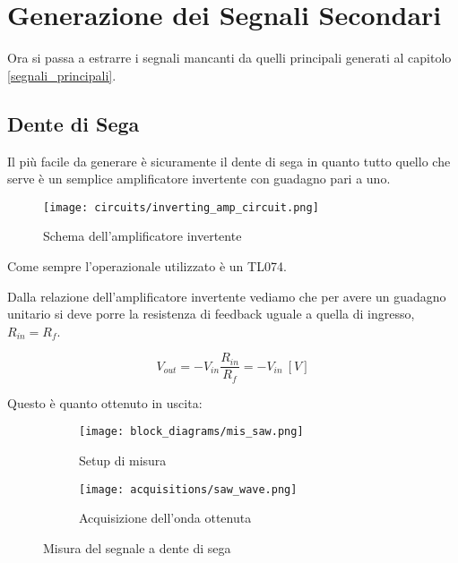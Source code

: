 \chapter{Generazione dei Segnali Secondari}\label{segnali_secondari}


Ora si passa a estrarre i segnali mancanti da quelli principali generati al capitolo \ref{segnali_principali}.


\section{Dente di Sega}


Il più facile da generare è sicuramente il dente di sega in quanto tutto quello che serve è un
semplice amplificatore invertente con guadagno pari a uno.

\begin{figure}[H]
    \centering
    \texttt{[image: circuits/inverting\_amp\_circuit.png]}
    \caption{Schema dell'amplificatore invertente}
    \label{inverting_amp_circuit}
\end{figure}

Come sempre l'operazionale utilizzato è un TL074.

Dalla relazione dell'amplificatore invertente vediamo che per avere un guadagno unitario si
deve porre la resistenza di feedback uguale a quella di ingresso, $R_{in}=R_f$.

\begin{equation}
    V_{out}=-V_{in}\frac{R_{in}}{R_f}=-V_{in}\ [V]
\end{equation}

Questo è quanto ottenuto in uscita:

\begin{figure}[H]
    \centering

    \begin{subfigure}{.5\textwidth}
        \centering
        \texttt{[image: block\_diagrams/mis\_saw.png]}
        \caption{Setup di misura}
        \label{mis_saw}
    \end{subfigure}%
    \begin{subfigure}{.5\textwidth}
        \centering
        \texttt{[image: acquisitions/saw\_wave.png]}
        \caption{Acquisizione dell'onda ottenuta}
        \label{acq_saw}
    \end{subfigure}

    \caption{Misura del segnale a dente di sega}
\end{figure}

